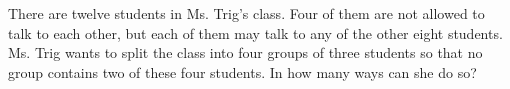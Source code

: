 There are twelve students in Ms. Trig's class. Four of them are not allowed to talk to each other, but each of them may talk to any of the other eight students. Ms. Trig wants to split the class into four groups of three students so that no group contains two of these four students. In how many ways can she do so?

